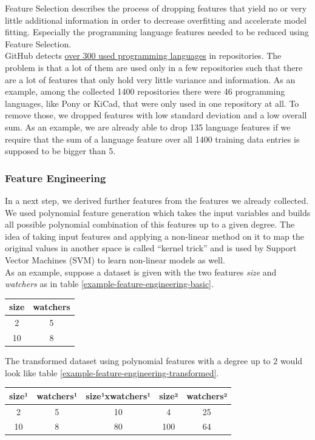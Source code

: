 \documentclass{article}
\begin{document}
Feature Selection describes the process of dropping features that yield
no or very little additional information in order to decrease
overfitting and accelerate model fitting. Especially the programming
language features needed to be reduced using Feature Selection.\\
GitHub detects
\href{https://github.com/github/linguist/blob/master/lib/linguist/languages.yml}{over
300 used programming languages} in repositories. The problem is that a
lot of them are used only in a few repositories such that there are a
lot of features that only hold very little variance and information. As
an example, among the collected 1400 repositories there were 46
programming languages, like Pony or KiCad, that were only used in one
repository at all. To remove those, we dropped features with low
standard deviation and a low overall sum. As an example, we are already
able to drop 135 language features if we require that the sum of a
language feature over all 1400 training data entries is supposed to be
bigger than 5.

\subsubsection{Feature Engineering}\label{feature-engineering}

In a next step, we derived further features from the features we already
collected. We used polynomial feature generation which takes the input
variables and builds all possible polynomial combination of this
features up to a given degree. The idea of taking input features and
applying a non-linear method on it to map the original values in another
space is called ``kernel trick'' and is used by Support Vector Machines
(SVM) to learn non-linear models as well.\\
As an example, suppose a dataset is given with the two features
\emph{size} and \emph{watchers} as in table \ref{example-feature-engineering-basic}.

\begin{longtable}[]{@{}cc@{}}
\toprule
size & watchers\tabularnewline
\midrule
\endhead
2 & 5\tabularnewline
10 & 8\tabularnewline
\bottomrule
\end{longtable}

The transformed dataset using polynomial features with a degree up to 2
would look like table \ref{example-feature-engineering-transformed}.

\begin{longtable}[]{@{}ccccc@{}}
\toprule
size¹ & watchers¹ & size¹xwatchers¹ & size² & watchers²\tabularnewline
\midrule
\endhead
2 & 5 & 10 & 4 & 25\tabularnewline
10 & 8 & 80 & 100 & 64\tabularnewline
\bottomrule
\end{longtable}
\end{document}
